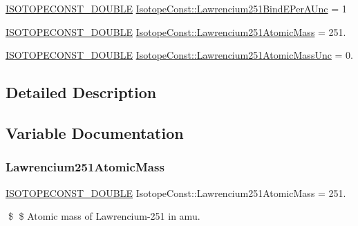 \begin{DoxyCompactItemize}
\mbox{\hyperlink{group___isotope_const-_macros_ga8f45a7272ce02c0b4c65c44636ed719a}{I\+S\+O\+T\+O\+P\+E\+C\+O\+N\+S\+T\+\_\+\+D\+O\+U\+B\+LE}} \mbox{\hyperlink{group___isotope_const-_lawrencium-_lr251_gaf8206413e8529acad546b1d28c4ac9f2}{Isotope\+Const\+::\+Lawrencium251\+Bind\+E\+Per\+A\+Unc}} = 1
\item 
\mbox{\hyperlink{group___isotope_const-_macros_ga8f45a7272ce02c0b4c65c44636ed719a}{I\+S\+O\+T\+O\+P\+E\+C\+O\+N\+S\+T\+\_\+\+D\+O\+U\+B\+LE}} \mbox{\hyperlink{group___isotope_const-_lawrencium-_lr251_gab7ca570a5d09fd317632bb091465e23c}{Isotope\+Const\+::\+Lawrencium251\+Atomic\+Mass}} = 251.
\item 
\mbox{\hyperlink{group___isotope_const-_macros_ga8f45a7272ce02c0b4c65c44636ed719a}{I\+S\+O\+T\+O\+P\+E\+C\+O\+N\+S\+T\+\_\+\+D\+O\+U\+B\+LE}} \mbox{\hyperlink{group___isotope_const-_lawrencium-_lr251_ga81ef9100cdad76bfba804549243130b2}{Isotope\+Const\+::\+Lawrencium251\+Atomic\+Mass\+Unc}} = 0.
\end{DoxyCompactItemize}


\subsection{Detailed Description}


\subsection{Variable Documentation}
\mbox{\label{group___isotope_const-_lawrencium-_lr251_gab7ca570a5d09fd317632bb091465e23c}} 
\subsubsection{\texorpdfstring{Lawrencium251\+Atomic\+Mass}{Lawrencium251AtomicMass}}
{\footnotesize\ttfamily \mbox{\hyperlink{group___isotope_const-_macros_ga8f45a7272ce02c0b4c65c44636ed719a}{I\+S\+O\+T\+O\+P\+E\+C\+O\+N\+S\+T\+\_\+\+D\+O\+U\+B\+LE}} Isotope\+Const\+::\+Lawrencium251\+Atomic\+Mass = 251.}

\$ \$ Atomic mass of Lawrencium-\/251 in amu. \mbox{\label{group___isotope_const-_lawrencium-_lr251_ga81ef9100cdad76bfba804549243130b2}} 
